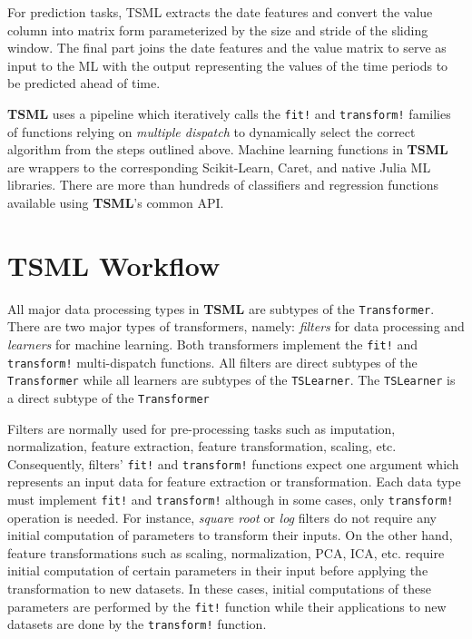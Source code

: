 \documentclass{juliacon}
\begin{document}
\vskip 6pt

For prediction tasks, TSML extracts the date features and 
convert the value column into matrix form parameterized by 
the size and stride of the sliding window. The final part joins
 the date features and the value matrix to serve as input to the 
 ML with the output representing the values of the time periods 
 to be predicted ahead of time.
 
 \vskip 6pt
 
\textbf{TSML} uses a pipeline which iteratively calls the \texttt{fit!} and \texttt{transform!}
families of functions relying on \emph{multiple dispatch} to dynamically select the correct algorithm from the steps outlined above. Machine learning functions in 
\textbf{TSML} are wrappers to the corresponding Scikit-Learn, Caret, and native Julia ML libraries. 
There are more than hundreds of classifiers and regression functions available using \textbf{TSML}'s common API.

\section{TSML Workflow}
\label{sec:tsmlworkflow}
%

All major data processing types in \textbf{TSML} are subtypes of the \texttt{Transformer}. There are two major types of transformers, namely: \emph{filters} for data processing and \emph{learners} for machine learning. Both transformers implement the \texttt{fit!} and \texttt{transform!} multi-dispatch functions. All filters are direct subtypes of the \texttt{Transformer} while all learners are subtypes of the \texttt{TSLearner}. The \texttt{TSLearner} is a direct subtype of the \texttt{Transformer}


\vskip 6pt

Filters are normally used for pre-processing tasks such as imputation, normalization, feature extraction, feature transformation, scaling, etc.
Consequently, filters' \texttt{fit!} and \texttt{transform!} functions expect one argument which represents an input data for feature extraction or transformation. Each data type must implement \texttt{fit!} and \texttt{transform!} although in some cases, only \texttt{transform!} operation is needed. For instance, \emph{square root} or \emph{log} filters do not require any initial computation of parameters to transform their inputs. On the other hand, feature transformations such as scaling, normalization, PCA, ICA, etc. require initial computation of certain parameters in their input before applying the transformation to new datasets. In these cases, initial computations of these parameters are performed by the \texttt{fit!} function while their applications to new datasets are done by the \texttt{transform!} function. 
\end{document}
